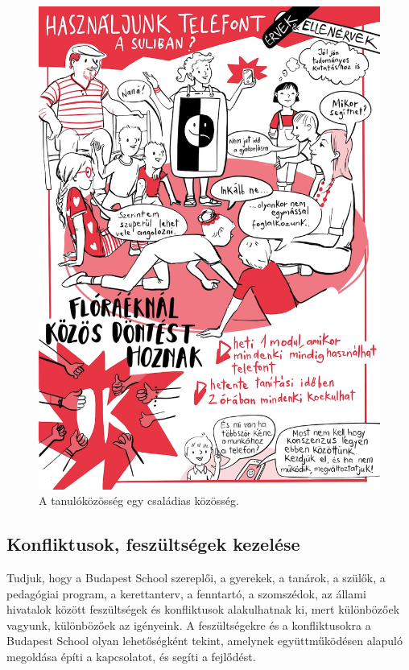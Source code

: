 \begin{figure}
\centering
\includegraphics{pics/5b_dontes.jpg}
\caption{A tanulóközösség egy családias közösség.}
\end{figure}

\hypertarget{konfliktusok-feszultsegek-kezelese}{%
\subsection{Konfliktusok, feszültségek
kezelése}\label{konfliktusok-feszultsegek-kezelese}}

Tudjuk, hogy a Budapest School szereplői, a gyerekek, a tanárok, a
szülők, a pedagógiai program, a kerettanterv, a fenntartó, a szomszédok,
az állami hivatalok között feszültségek és konfliktusok alakulhatnak ki,
mert különbözőek vagyunk, különbözőek az igényeink. A feszültségekre és
a konfliktusokra a Budapest School olyan lehetőségként tekint, amelynek
együttműködésen alapuló megoldása építi a kapcsolatot, és segíti a
fejlődést.

